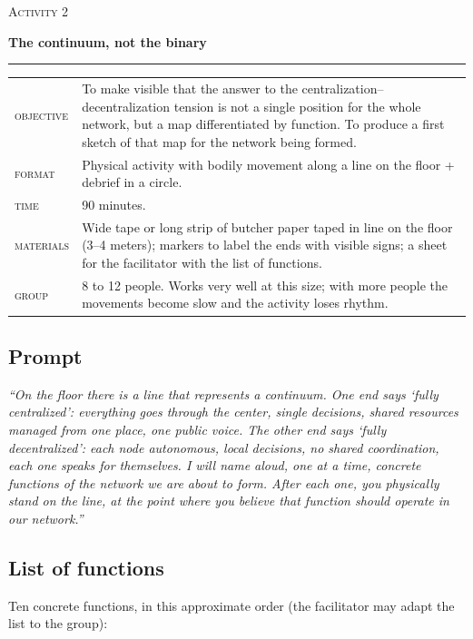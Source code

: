 \documentclass[11pt, a4paper]{article}
\newcommand{\etiqueta}[1]{\textcolor{organizacionVerde}{\scshape #1}}
\newcommand{\tituloActividad}[2]{%
  {\color{tenue}\scshape\normalsize Activity #1}\par
  \vspace{0.15em}
  {\color{organizacionVerde}\LARGE\bfseries #2}\par
  \vspace{0.3em}
  {\color{regla}\rule{\linewidth}{0.4pt}}\par
  \vspace{0.5em}
}
\begin{document}
\begin{actividad}
\tituloActividad{2}{The continuum, not the binary}

\begin{ficha}
\begin{tabular}{@{}p{6em}@{\hspace{1em}}p{\dimexpr\linewidth-7.6em}@{}}
  \etiqueta{objective}  & To make visible that the answer to the centralization--decentralization tension is not a single position for the whole network, but a map differentiated by function. To produce a first sketch of that map for the network being formed. \\[0.35em]
  \etiqueta{format}     & Physical activity with bodily movement along a line on the floor + debrief in a circle. \\[0.35em]
  \etiqueta{time}       & 90 minutes. \\[0.35em]
  \etiqueta{materials}  & Wide tape or long strip of butcher paper taped in line on the floor (3--4 meters); markers to label the ends with visible signs; a sheet for the facilitator with the list of functions. \\[0.35em]
  \etiqueta{group}      & 8 to 12 people. Works very well at this size; with more people the movements become slow and the activity loses rhythm.
\end{tabular}
\end{ficha}

\subsection*{Prompt}
\emph{``On the floor there is a line that represents a continuum. One end says `fully centralized': everything goes through the center, single decisions, shared resources managed from one place, one public voice. The other end says `fully decentralized': each node autonomous, local decisions, no shared coordination, each one speaks for themselves. I will name aloud, one at a time, concrete functions of the network we are about to form. After each one, you physically stand on the line, at the point where you believe that function should operate in our network.''}

\subsection*{List of functions}
Ten concrete functions, in this approximate order (the facilitator may adapt the list to the group):


\end{actividad}
\end{document}
